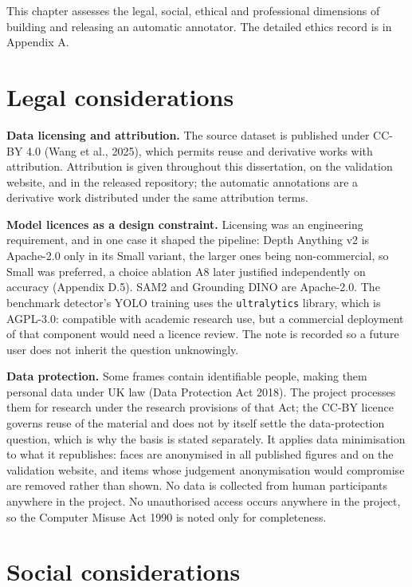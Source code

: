 
This chapter assesses the legal, social, ethical and professional dimensions of building and releasing an automatic annotator. The detailed ethics record is in Appendix A.

\section{Legal considerations}

\textbf{Data licensing and attribution.} The source dataset is published under CC-BY 4.0 (Wang et al., 2025), which permits reuse and derivative works with attribution. Attribution is given throughout this dissertation, on the validation website, and in the released repository; the automatic annotations are a derivative work distributed under the same attribution terms.

\textbf{Model licences as a design constraint.} Licensing was an engineering requirement, and in one case it shaped the pipeline: Depth Anything v2 is Apache-2.0 only in its Small variant, the larger ones being non-commercial, so Small was preferred, a choice ablation A8 later justified independently on accuracy (Appendix D.5). SAM2 and Grounding DINO are Apache-2.0. The benchmark detector's YOLO training uses the \texttt{ultralytics} library, which is AGPL-3.0: compatible with academic research use, but a commercial deployment of that component would need a licence review. The note is recorded so a future user does not inherit the question unknowingly.

\textbf{Data protection.} Some frames contain identifiable people, making them personal data under UK law (Data Protection Act 2018). The project processes them for research under the research provisions of that Act; the CC-BY licence governs reuse of the material and does not by itself settle the data-protection question, which is why the basis is stated separately. It applies data minimisation to what it republishes: faces are anonymised in all published figures and on the validation website, and items whose judgement anonymisation would compromise are removed rather than shown. No data is collected from human participants anywhere in the project. No unauthorised access occurs anywhere in the project, so the Computer Misuse Act 1990 is noted only for completeness.

\section{Social considerations}

